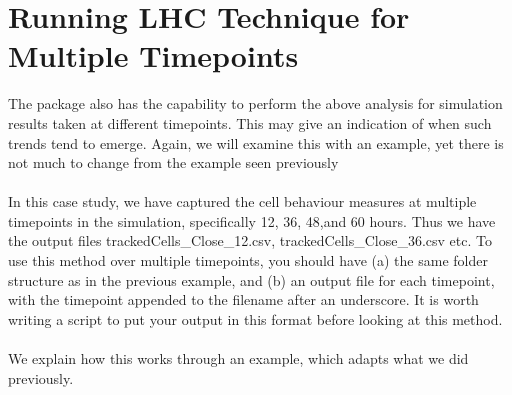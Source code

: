 \documentclass[a4paper,11pt]{article}
\begin{document}
\section{Running LHC Technique for Multiple Timepoints}
\noindent The package also has the capability to perform the above analysis for simulation results taken at different timepoints. This may give an indication of when such trends tend to emerge.  Again, we will examine this with an example, yet there is not much to change from the example seen previously\\
\\
In this case study, we have captured the cell behaviour measures at multiple timepoints in the simulation, specifically 12, 36, 48,and 60 hours.  Thus we have the output files trackedCells\_Close\_12.csv, trackedCells\_Close\_36.csv etc. To use this method over multiple timepoints, you should have (a) the same folder structure as in the previous example, and (b) an output file for each timepoint, with the timepoint appended to the filename after an underscore. It is worth writing a script to put your output in this format before looking at this method.\\
\\
We explain how this works through an example, which adapts what we did previously. 
\end{document}
